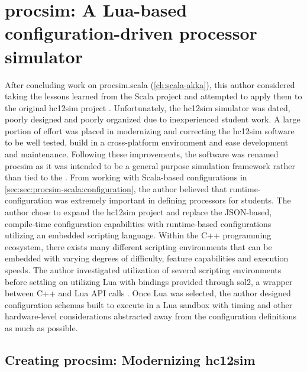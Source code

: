 \chapter{procsim: A Lua-based configuration-driven processor simulator}
\label{ch:lua-config}
    
After concluding work on procsim.scala (\cref{ch:scala-akka}), this author considered taking the lessons learned from the Scala project and attempted to apply them to the original hc12sim project \cite{Brightwell2013}. Unfortunately, the hc12sim simulator was dated, poorly designed and poorly organized due to inexperienced student work. A large portion of effort was placed in modernizing and correcting the hc12sim software to be well tested, build in a cross-platform environment and ease development and maintenance. Following these improvements, the software was renamed procsim as it was intended to be a general purpose simulation framework rather than tied to the \hcmodel{}. From working with Scala-based configurations in \cref{sec:sec:procsim-scala:configuration}, the author believed that runtime-configuration was extremely important in defining processors for students. The author chose to expand the hc12sim project and replace the JSON-based, compile-time configuration capabilities with runtime-based configurations utilizing an embedded scripting language. Within the C++ programming ecosystem, there exists many different scripting environments that can be embedded with varying degrees of difficulty, feature capabilities and execution speeds. The author investigated utilization of several scripting environments before settling on utilizing Lua \cite{LuaHomepage} with bindings provided through sol2, a wrapper between C++ and Lua API calls \cite{Solv2.11.7}. Once Lua was selected, the author designed configuration schemas built to execute in a Lua sandbox with timing and other hardware-level considerations abstracted away from the configuration definitions as much as possible.

\section{Creating procsim: Modernizing hc12sim}

